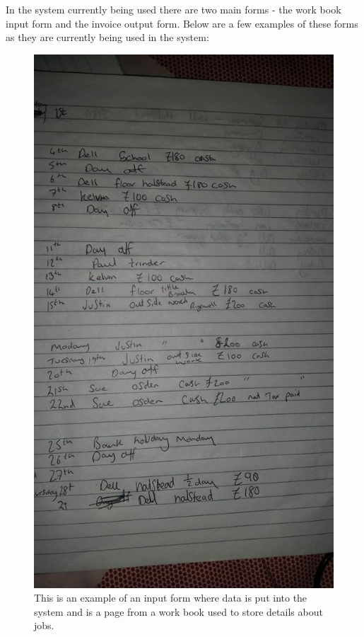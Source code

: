 \begin{flushleft}
	
	In the system currently being used there are two main forms - the work book input form and the invoice output form. Below are a few examples of these forms as they are currently being used in the system:

\end{flushleft}
\begin{figure}[H]
    \includegraphics[scale=0.4]{./Analysis/images/workbookPage.jpg}
    \caption{This is an example of an input form where data is put into the system and is a page from a work book used to store details about jobs.} \label{fig:work_book_page}
\end{figure}

